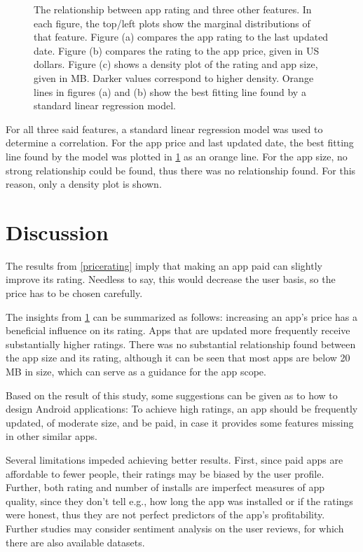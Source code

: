\documentclass{article}
\begin{document}
\begin{figure}[h]
\caption{The relationship between app rating and three other features. In each figure, the top/left plots show the marginal distributions of that feature. Figure (a) compares the app rating to the last updated date. Figure (b) compares the rating to the app price, given in US dollars. Figure (c) shows a density plot of the rating and app size, given in MB. Darker values correspond to higher density. Orange lines in figures (a) and (b) show the best fitting line found by a standard linear regression model.}
\label{fig2}
\end{figure}

For all three said features, a standard linear regression model was used to determine a correlation. For the app price and last updated date, the best fitting line found by the model was plotted in \cref{fig2} as an orange line. For the app size, no strong relationship could be found, thus there was no relationship found. For this reason, only a density plot is shown. 


\section{Discussion}

The results from \cref{pricerating} imply that making an app paid can slightly improve its rating. Needless to say, this would decrease the user basis, so the price has to be chosen carefully.

The insights from \cref{fig2} can be summarized as follows: increasing an app's price has a beneficial influence on its rating. Apps that are updated more frequently receive substantially higher ratings. There was no substantial relationship found between the app size and its rating, although it can be seen that most apps are below 20 MB in size, which can serve as a guidance for the app scope.

Based on the result of this study, some suggestions can be given as to how to design Android applications: To achieve high ratings, an app should be frequently updated, of moderate size, and be paid, in case it provides some features missing in other similar apps.

Several limitations impeded achieving better results. First, since paid apps are affordable to fewer people, their ratings may be biased by the user profile. Further, both rating and number of installs are imperfect measures of app quality, since they don't tell e.g., how long the app was installed or if the ratings were honest, thus they are not perfect predictors of the app's profitability. Further studies may consider sentiment analysis on the user reviews, for which there are also available datasets.
\end{document}
